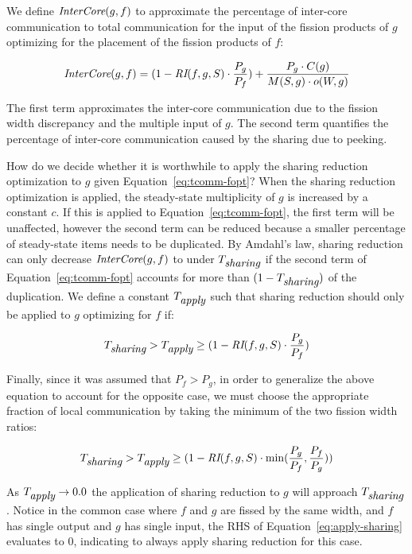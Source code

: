 We define $\mbox{\it InterCore}(g, f)$ to approximate the percentage
of inter-core communication to total communication for the input of
the fission products of $g$ optimizing for the placement of the
fission products of $f$:

\begin{equation}
\label{eq:tcomm-fopt}
 \mt{InterCore}(g, f)   =  (1 -\mt{RI}(f,g, S) \cdot \frac{P_g}{P_f})
 + \frac{P_g \cdot C(g)}{M(S, g) \cdot o(W, g)}
\end{equation}

\noindent The first term approximates the inter-core communication due
to the fission width discrepancy and the multiple input of $g$.  The
second term quantifies the percentage of inter-core communication
caused by the sharing due to peeking.

How do we decide whether it is worthwhile to apply the sharing
reduction optimization to $g$ given Equation~\ref{eq:tcomm-fopt}? When
the sharing reduction optimization is applied, the steady-state
multiplicity of $g$ is increased by a constant $c$.  If this is
applied to Equation~\ref{eq:tcomm-fopt}, the first term will be
unaffected, however the second term can be reduced because a smaller
percentage of steady-state items needs to be duplicated.  By Amdahl's
law, sharing reduction can only decrease $\mbox{\it InterCore}(g,
f)$ to under $T_{\mbox{\it sharing}}$ if the second term of Equation~\ref{eq:tcomm-fopt}
accounts for more than $(1-T_{\mbox{\it sharing}} )$ of the duplication.  We
define a constant $T_{\mbox{\it apply}}$ such that sharing
reduction should only be applied to $g$ optimizing for $f$ if:

\begin{equation}
T_{\mbox{\it sharing}}  >  T_{\mbox{\it apply}} \ge (1 -\mbox{\it RI}(f,g, S) \cdot
\frac{P_g}{P_f})
\end{equation}

Finally, since it was assumed that $P_f > P_g$, in order to generalize
the above equation to account for the opposite case, we must choose
the appropriate fraction of local communication by taking the minimum
of the two fission width ratios:

\begin{equation}
\label{eq:apply-sharing}
T_{\mt{sharing}}  >  T_{\mt{apply}} \ge (1 -\mt{RI}(f,g, S) \cdot
\min(\frac{P_g}{P_f}, \frac{P_f}{P_g}))
\end{equation}

\noindent As $T_{\mbox{\it apply}} \rightarrow 0.0$ the application of
sharing reduction to $g$ will approach $T_{\mbox{\it sharing}}$. Notice in
the common case where $f$ and $g$ are fissed by the same width, and
$f$ has single output and $g$ has single input, the RHS of
Equation~\ref{eq:apply-sharing} evaluates to 0, indicating to always
apply sharing reduction for this case.

